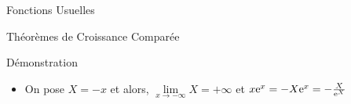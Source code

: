 \documentclass{coursbook}
\begin{document}
\begin{Gpartie}{Fonctions Usuelles}
\begin{Spartie}{Théorèmes de Croissance Comparée}
\begin{SSpartie}{Démonstration}
\begin{itemize}
                    Soit $f$ définie sur $\big]0~;+\infty\big[$ par $f(x)=\me^x-\frac{x^2}{2}$. Étudions les variations de $f$.

                    $f'(x)=\me^x-x$ on ne conclut pas directement sur le signe. Dérivons encore :

                    $f''(x)=\me^x-1\quad\text{et}\quad \me^x-1>0\iff \me^x>1\iff x>0$

                    Donc, $f''(x)$ est strictement positive pour $x>0$.

                    Ainsi on a $f'(x)$ strictement croissante sur $\big]0~;+\infty\big[$ et comme $f'(0)=1>0$, $f'$ est strictement positive sur $\big]0~;+\infty\big[$ :
                    \begin{center}                        
                        \parbox{\linewidth}{}
                    \end{center}
                    Donc, pour tout $x\in\big]0~;+\infty\big[,~\me^x-\frac{x^2}{2}>0$ et donc $\me^x>\frac{x^2}{2}$ \\ Comme $x>0$ on peut diviser par $x$ : \\ Donc, $\frac{\me^x}{x}>\frac{x}{2}$ et comme $\lim\limits_{x\to+\infty}\frac{x}{2}=+\infty$, par comparaison : \[\lim\limits_{x\to+\infty}\frac{\me^x}{x}=+\infty\quad\square\]
                    \item On pose $X=-x$ et alors, $\lim\limits_{x\to-\infty}X=+\infty$ et $x\me^x=-X\me^{x}=-\frac{X}{\me^X}$
                    

\end{itemize}
\end{SSpartie}
\end{Spartie}
\end{Gpartie}
\end{document}

